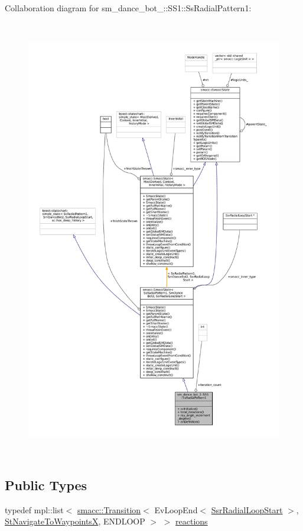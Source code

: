 Collaboration diagram for sm\+\_\+dance\+\_\+bot\+\_\+:\+:S\+S1\+:\+:Ss\+Radial\+Pattern1\+:
\nopagebreak
\begin{figure}[H]
\begin{center}
\leavevmode
\includegraphics[height=550pt]{structsm__dance__bot__2_1_1SS1_1_1SsRadialPattern1__coll__graph}
\end{center}
\end{figure}
\subsection*{Public Types}
\begin{DoxyCompactItemize}
\item 
typedef mpl\+::list$<$ \hyperlink{classsmacc_1_1Transition}{smacc\+::\+Transition}$<$ Ev\+Loop\+End$<$ \hyperlink{structsm__dance__bot__2_1_1radial__motion__states_1_1SsrRadialLoopStart}{Ssr\+Radial\+Loop\+Start} $>$, \hyperlink{structsm__dance__bot__2_1_1StNavigateToWaypointsX}{St\+Navigate\+To\+WaypointsX}, E\+N\+D\+L\+O\+OP $>$ $>$ \hyperlink{structsm__dance__bot__2_1_1SS1_1_1SsRadialPattern1_ae623287de9ebeef1e23a249507e5ba45}{reactions}
\end{DoxyCompactItemize}
